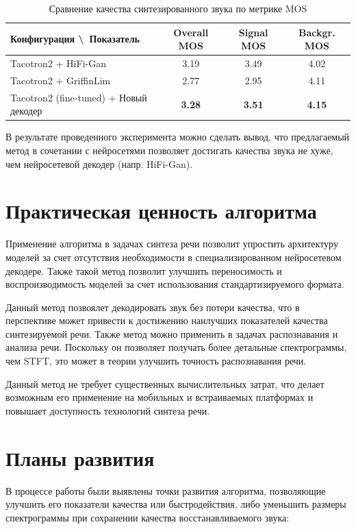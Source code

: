 \begin{table}[h!]
\centering

\begin{tabular}{||m{5cm} c c c||} 
 \hline
  Конфигурация \textbackslash \ Показатель &  Overall MOS & Signal MOS & Backgr. MOS \\ [0.5ex] 
 \hline\hline
  Tacotron2 + HiFi-Gan & 3.19 & 3.49 & 4.02 \\
  Tacotron2 + GriffinLim & 2.77 & 2.95 & 4.11 \\
  Tacotron2 (fine-tuned) + Новый декодер & \textbf{3.28} & \textbf{3.51} & \textbf{4.15} \\ [1ex] 
 \hline
\end{tabular}
\caption{Сравнение качества синтезированного звука по метрике MOS}
\label{table:mos_tacotron}
\end{table}

В результате проведенного эксперимента можно сделать вывод, что предлагаемый метод в сочетании с нейросетями 
позволяет достигать качества звука не хуже, чем нейросетевой декодер (напр. HiFi-Gan).


\section{Практическая ценность алгоритма}

Применение алгоритма в задачах синтеза речи позволит упростить архитектуру моделей за счет отсутствия необходимости в 
специализированном нейросетевом декодере. Также такой метод позволит улучшить переносимость и воспроизводимость моделей 
за счет использования стандартизируемого формата. 

Данный метод позвоялет декодировать звук без потери качества, что в перспективе может привести к достижению наилучших показателей 
качества синтезируемой речи. Также метод можно применить в задачах распознавания и анализа речи. 
Поскольку он позволяет получать более детальные спектрограммы, чем STFT, это может в теории улучшить точность распознавания речи.

Данный метод не требует существенных вычислительных затрат, что делает возможным его применение на мобильных и встраиваемых платформах
и повышает доступность технологий синтеза речи.

\section{Планы развития}

В процессе работы были выявлены точки развития алгоритма, позволяющие улучшить его показатели качества или быстродействия, 
либо уменьшить размеры спектрограммы при сохранении качества восстанавливаемого звука:


